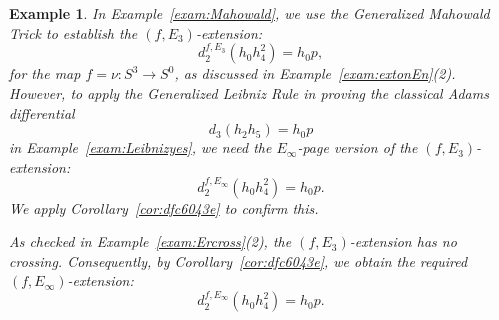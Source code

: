 \documentclass[12pt,a4paper]{article}
\newtheorem{example}[equation]{Example}
\begin{document}
\begin{sloppy}
\begin{example} \label{exam:stretchext}
    In Example~\ref{exam:Mahowald}, we use the Generalized Mahowald Trick to establish the $(f, E_3)$-extension:
        $$d_2^{f, E_3} (h_0h_4^2) = h_0 p,$$
        for the map $f=\nu:S^3 \rightarrow S^0$, as discussed
in Example~\ref{exam:extonEn}(2). However, to apply the Generalized Leibniz Rule in proving the classical Adams differential
$$d_3(h_2h_5) = h_0p$$
in Example~\ref{exam:Leibnizyes}, we need the $E_\infty$-page version of the $(f, E_3)$-extension:
$$d_2^{f, E_\infty} (h_0h_4^2) = h_0 p.$$
We apply Corollary~\ref{cor:dfc6043e} to confirm this.

As checked in Example~\ref{exam:Ercross}(2), the $(f, E_3)$-extension has no crossing. Consequently, by Corollary~\ref{cor:dfc6043e}, we obtain the required $(f, E_\infty)$-extension:
$$d_2^{f, E_\infty} (h_0h_4^2) = h_0 p.$$
\end{example}

\end{sloppy}
\end{document}
